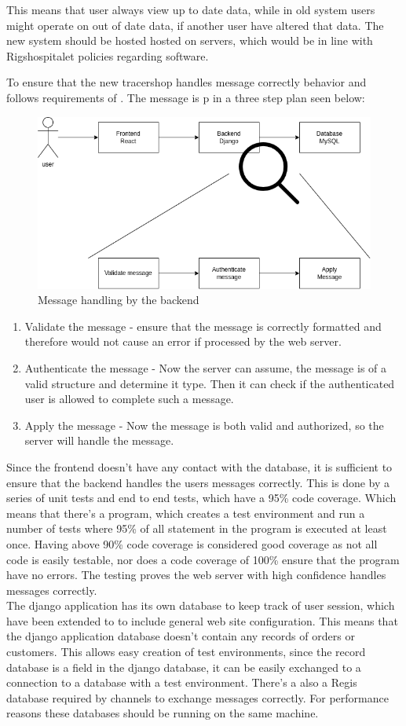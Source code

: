 \documentclass{article}
\begin{document}
This means that user always view up to date data, while in old system users might operate on out of date data, if another user have altered that data.
The new system should be hosted hosted on  servers, which would be in line with Rigshospitalet policies regarding software.

To ensure that the new tracershop handles message correctly behavior and follows requirements of . The message is p in a three step plan seen below:
\begin{figure}[ht]
  \begin{center}
    \includegraphics[width=0.6\linewidth]{MessageHandeling.png}
    \caption{Message handling by the backend}
    \label{fig:messageHandle}
  \end{center}
\end{figure}

\begin{enumerate}
  \item Validate the message - ensure that the message is correctly formatted and therefore would not cause an error if processed by the web server.
  \item Authenticate the message - Now the server can assume, the message is of a valid structure and determine it type.
  Then it can check if the authenticated user is allowed to complete such a message.
  \item Apply the message - Now the message is both valid and authorized, so the server will handle the message.
\end{enumerate}
Since the frontend doesn't have any contact with the database,
it is sufficient to ensure that the backend handles the users messages correctly.
This is done by a series of unit tests and end to end tests, which have a 95\% code coverage.
Which means that there's a program, which creates a test environment and run a number of tests where 95\% of all statement in the program is executed at least once.
Having above 90\% code coverage is considered good coverage as not all code is easily testable, nor does a code coverage of 100\% ensure that the program have no errors.
The testing proves the web server with high confidence handles messages correctly.\\
The django application has its own database to keep track of user session, which have been extended to to include general web site configuration.
This means that the django application database doesn't contain any records of orders or customers. This allows easy creation of test environments,
since the record database is a field in the django database, it can be easily exchanged to a connection to a database with a test environment.
There's a also a Regis database required by channels to exchange messages correctly. For performance reasons these databases should be running on the same machine.
\end{document}
